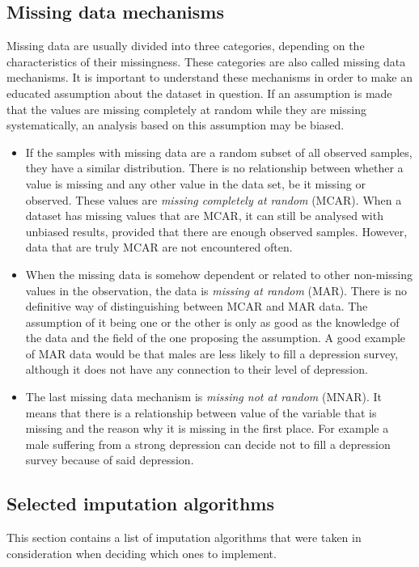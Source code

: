 \documentclass[11pt]{article}
\begin{document}
    \subsection{Missing data mechanisms}
      \label{sec:missmech}
      Missing data are usually divided into three categories, depending on the characteristics of their missingness. These categories are also called missing data mechanisms.\cite{lwd} It is important to understand these mechanisms in order to make an educated assumption about the dataset in question. If an assumption is made that the values are missing completely at random while they are missing systematically, an analysis based on this assumption may be biased.
      \begin{itemize}
      \item If the samples with missing data are a random subset of all observed samples, they have a similar distribution. There is no relationship between whether a value is missing and any other value in the data set, be it missing or observed. These values are {\it missing completely at random} (MCAR).\cite{lwd} When a dataset has missing values that are MCAR, it can still be analysed with unbiased results, provided that there are enough observed samples. However, data that are truly MCAR are not encountered often.
      \item When the missing data is somehow dependent or related to other non-missing values in the observation, the data is {\it missing at random} (MAR).\cite{lwd} There is no definitive way of distinguishing between MCAR and MAR data. The assumption of it being one or the other is only as good as the knowledge of the data and the field of the one proposing the assumption. A good example of MAR data would be that males are less likely to fill a depression survey, although it does not have any connection to their level of depression.
      \item The last missing data mechanism is {\it missing not at random} (MNAR). It means that there is a relationship between value of the variable that is missing and the reason why it is missing in the first place. For example a male suffering from a strong depression can decide not to fill a depression survey because of said depression.
      \end{itemize}
    \subsection{Selected imputation algorithms}
      This section contains a list of imputation algorithms that were taken in consideration when deciding which ones to implement.
\end{document}
